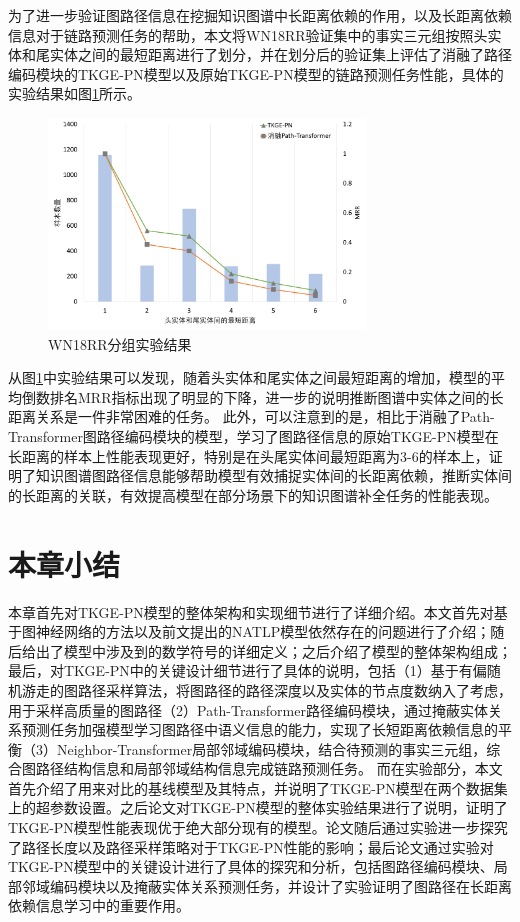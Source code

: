 为了进一步验证图路径信息在挖掘知识图谱中长距离依赖的作用，以及长距离依赖信息对于链路预测任务的帮助，本文将WN18RR验证集中的事实三元组按照头实体和尾实体之间的最短距离进行了划分，并在划分后的验证集上评估了消融了路径编码模块的TKGE-PN模型以及原始TKGE-PN模型的链路预测任务性能，具体的实验结果如图\ref{tkge_experiment}所示。

\begin{figure}[htbp]
    \centerline{\includegraphics[width=0.75\textwidth]{pic/TKGE-PN_experiment.pdf}}
    \caption{WN18RR分组实验结果}
    \label{tkge_experiment}
  \end{figure}

从图\ref{tkge_experiment}中实验结果可以发现，随着头实体和尾实体之间最短距离的增加，模型的平均倒数排名MRR指标出现了明显的下降，进一步的说明推断图谱中实体之间的长距离关系是一件非常困难的任务。 此外，可以注意到的是，相比于消融了Path-Transformer图路径编码模块的模型，学习了图路径信息的原始TKGE-PN模型在长距离的样本上性能表现更好，特别是在头尾实体间最短距离为3-6的样本上，证明了知识图谱图路径信息能够帮助模型有效捕捉实体间的长距离依赖，推断实体间的长距离的关联，有效提高模型在部分场景下的知识图谱补全任务的性能表现。


\section{本章小结}

本章首先对TKGE-PN模型的整体架构和实现细节进行了详细介绍。本文首先对基于图神经网络的方法以及前文提出的NATLP模型依然存在的问题进行了介绍；随后给出了模型中涉及到的数学符号的详细定义；之后介绍了模型的整体架构组成；最后，对TKGE-PN中的关键设计细节进行了具体的说明，包括（1）基于有偏随机游走的图路径采样算法，将图路径的路径深度以及实体的节点度数纳入了考虑，用于采样高质量的图路径（2）Path-Transformer路径编码模块，通过掩蔽实体关系预测任务加强模型学习图路径中语义信息的能力，实现了长短距离依赖信息的平衡（3）Neighbor-Transformer局部邻域编码模块，结合待预测的事实三元组，综合图路径结构信息和局部邻域结构信息完成链路预测任务。
而在实验部分，本文首先介绍了用来对比的基线模型及其特点，并说明了TKGE-PN模型在两个数据集上的超参数设置。之后论文对TKGE-PN模型的整体实验结果进行了说明，证明了TKGE-PN模型性能表现优于绝大部分现有的模型。论文随后通过实验进一步探究了路径长度以及路径采样策略对于TKGE-PN性能的影响；最后论文通过实验对TKGE-PN模型中的关键设计进行了具体的探究和分析，包括图路径编码模块、局部邻域编码模块以及掩蔽实体关系预测任务，并设计了实验证明了图路径在长距离依赖信息学习中的重要作用。
